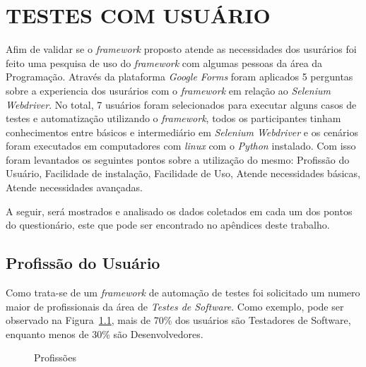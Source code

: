 
\chapter{TESTES COM USUÁRIO}\label{chap:result}

    Afim de validar se o \emph{framework} proposto atende as necessidades dos usurários foi feito uma pesquisa de uso do \emph{framework} com algumas pessoas da área da Programação.
    Através da plataforma \emph{Google Forms} foram aplicados 5 perguntas sobre a experiencia dos usurários com o \emph{framework} em relação ao \emph{Selenium Webdriver}.
    No total, 7 usuários foram selecionados para executar alguns casos de testes e automatização utilizando o \emph{framework}, todos os participantes tinham conhecimentos entre
    básicos e intermediário em \emph{Selenium Webdriver} e os cenários foram executados em computadores com \emph{linux} com o \emph{Python} instalado.
    Com isso foram levantados os seguintes pontos sobre a utilização do mesmo:
    Profissão do Usuário,
    Facilidade de instalação,
    Facilidade de Uso,
    Atende necessidades básicas,
    Atende necessidades avançadas.

    A seguir, será mostrados e analisado os dados coletados em cada um dos pontos do questionário, este que pode ser encontrado no apêndices deste trabalho.

    \section{Profissão do Usuário}
        Como trata-se de um \emph{framework} de automação de testes foi solicitado um numero maior de profissionais da área de \emph{Testes de Software}.
        Como exemplo, pode ser observado na Figura~\ref{fig:profissao}, mais de 70\% dos usuários são Testadores de Software, enquanto menos de 30\% são
        Desenvolvedores.

        \begin{figure}[H]
            \vspace*{0,2cm}
            \centering
            \caption{Profissões}
            \label{fig:profissao}
        \end{figure}
        \vspace*{-0,9cm}
        {\raggedright {}}

